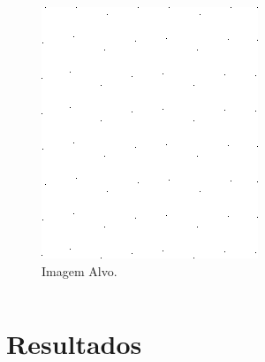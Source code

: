 \documentclass[t]{beamer}
\begin{document}
\begin{frame}
\begin{columns}[c]
\begin{figure}[!h]
\begin{center}
            \includegraphics[width=1.0\textwidth]{../images/movingCPSSin.png}
            \caption{Imagem Alvo.}
          \end{center}
        \end{figure}
    \end{columns}
\end{frame}

\section{Resultados}
\subsection{}
\end{document}
